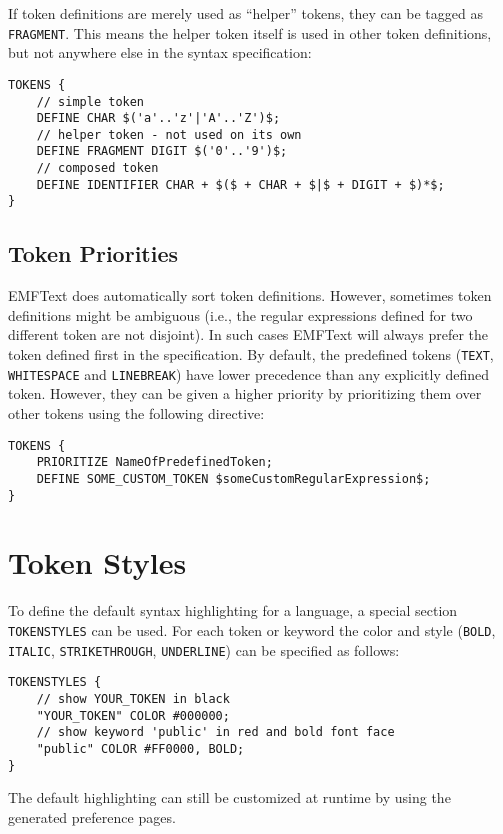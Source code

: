 If token definitions are merely used as ``helper'' tokens, they can be tagged
as \texttt{FRAGMENT}. This means the helper token itself is used in other token
definitions, but not anywhere else in the syntax specification:

\begin{lstlisting}
TOKENS {
    // simple token
    DEFINE CHAR $('a'..'z'|'A'..'Z')$;
    // helper token - not used on its own
    DEFINE FRAGMENT DIGIT $('0'..'9')$;
    // composed token
    DEFINE IDENTIFIER CHAR + $($ + CHAR + $|$ + DIGIT + $)*$;
}
\end{lstlisting}

\subsection{Token Priorities}

EMFText does automatically sort token definitions. However, sometimes 
token definitions might be ambiguous (i.e., the regular expressions defined for
two different token are not disjoint). In such cases EMFText will always prefer
the token defined first in the specification. By default, the predefined tokens
(\texttt{TEXT}, \texttt{WHITESPACE} and \texttt{LINEBREAK}) have lower
precedence than any explicitly defined token. However, they can be given a
higher priority by prioritizing them over other tokens using the following 
directive:

\begin{lstlisting}
TOKENS {
	PRIORITIZE NameOfPredefinedToken;
	DEFINE SOME_CUSTOM_TOKEN $someCustomRegularExpression$;
}
\end{lstlisting}

\section{Token Styles}

To define the default syntax highlighting for a language, a special section
\texttt{TOKENSTYLES} can be used. For each token or keyword the color and
style (\texttt{BOLD}, \texttt{ITALIC}, \texttt{STRIKETHROUGH},
\texttt{UNDERLINE}) can be specified as follows:

\begin{lstlisting}
TOKENSTYLES {
    // show YOUR_TOKEN in black
    "YOUR_TOKEN" COLOR #000000;
    // show keyword 'public' in red and bold font face
    "public" COLOR #FF0000, BOLD;
}
\end{lstlisting}

The default highlighting can still be customized at runtime by
using the generated preference pages.

